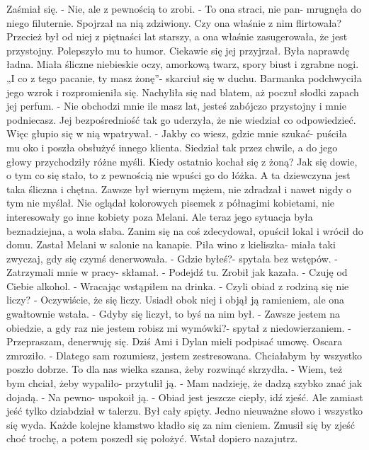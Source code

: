 \documentclass[12pt,a4paper]{book}
\begin{document}
Zaśmiał się. 
- Nie, ale z pewnością to zrobi. 
- To ona straci, nie pan- mrugnęła do niego filuternie. 
Spojrzał na nią zdziwiony. Czy ona właśnie z nim flirtowała? Przecież był od niej z piętnaści lat starszy, a ona właśnie zasugerowała, że jest przystojny. Polepszyło mu to humor. Ciekawie się jej przyjrzał. Była naprawdę ładna. Miała śliczne niebieskie oczy, amorkową twarz, spory biust i zgrabne nogi. „I co z tego pacanie, ty masz żonę”- skarciuł się w duchu. 
Barmanka podchwyciła jego wzrok i rozpromieniła się. Nachyliła się nad blatem, aż poczuł słodki zapach jej perfum. 
- Nie obchodzi mnie ile masz lat, jesteś zabójczo przystojny i mnie podniecasz. 
Jej bezpośredniość tak go uderzyła, że nie wiedział co odpowiedzieć. Więc głupio się w nią wpatrywał.
- Jakby co wiesz, gdzie mnie szukać- puściła mu oko i poszła obsłużyć innego klienta. 
Siedział tak przez chwile, a do jego głowy przychodziły różne myśli. Kiedy ostatnio kochał się z żoną? Jak się dowie, o tym co się stało, to z pewnością nie wpuści go do łóżka. A ta dziewczyna jest taka śliczna i chętna. Zawsze był wiernym mężem, nie zdradzał i nawet nigdy o tym nie myślał. Nie oglądał kolorowych pisemek z półnagimi kobietami, nie interesowały go inne kobiety poza Melani. Ale teraz jego sytuacja była beznadziejna, a wola słaba. Zanim się na coś zdecydował, opuścił lokal i wrócił do domu. 
Zastał Melani w salonie na kanapie. Piła wino z kieliszka- miała taki zwyczaj, gdy się czymś denerwowała. 
- Gdzie byłeś?- spytała bez wstępów. 
- Zatrzymali mnie w pracy- skłamał. 
- Podejdź tu. 
Zrobił jak kazała. 
- Czuję od Ciebie alkohol.
- Wracając wstąpiłem na drinka. 
- Czyli obiad z rodziną się nie liczy?
- Oczywiście, że się liczy.
Usiadł obok niej i objął ją ramieniem, ale ona gwałtownie wstała. 
- Gdyby się liczył, to byś na nim był. 
- Zawsze jestem na obiedzie, a gdy raz nie jestem robisz mi wymówki?- spytał z niedowierzaniem.
- Przepraszam, denerwuję się. Dziś Ami i Dylan mieli podpisać umowę. 
Oscara zmroziło. 
- Dlatego sam rozumiesz, jestem zestresowana. Chciałabym by wszystko poszło dobrze. To dla nas wielka szansa, żeby rozwinąć skrzydła. 
- Wiem, też bym chciał, żeby wypaliło- przytulił ją. 
- Mam nadzieję, że dadzą szybko znać jak dojadą. 
- Na pewno- uspokoił ją. 
- Obiad jest jeszcze ciepły, idź zjeść. 
Ale zamiast jeść tylko dziabdział w talerzu. Był cały spięty. Jedno nieuważne słowo i wszystko się wyda. Każde kolejne kłamstwo kładło się za nim cieniem. Zmusił się by zjeść choć trochę, a potem poszedł się położyć. Wstał dopiero nazajutrz. 
\end{document}
